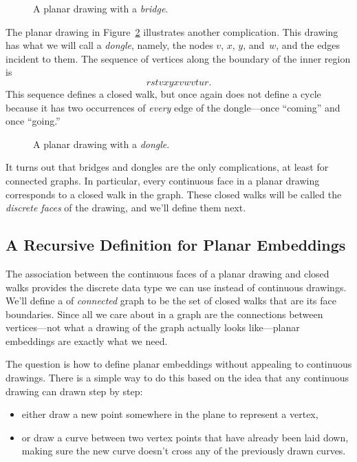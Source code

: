 \begin{figure}


\caption{A planar drawing with a \emph{bridge}.}
\label{fig:bridge}
\end{figure}

The planar drawing in Figure~\ref{fig:dongle} illustrates another
complication.  This drawing has what we will call a \emph{dongle},
namely, the nodes $v$, $x$, $y$, and~$w$, and the edges incident to
them.  The sequence of vertices along the boundary
of the inner region is
\[
rstvxyxvwvtur.
\]
This sequence defines a closed walk, but once again does not define a
cycle because it has two occurrences of \emph{every} edge of the
dongle---once ``coming'' and once ``going.''

\begin{figure}


\caption{A planar drawing with a \emph{dongle}.}
\label{fig:dongle}
\end{figure}

It turns out that bridges and dongles are the only complications, at
least for connected graphs.  In particular, every continuous face in a
planar drawing corresponds to a closed walk in the graph.  These
closed walks will be called the \emph{discrete faces} of the drawing,
and we'll define them next.

\subsection{A Recursive Definition for Planar Embeddings}

The association between the continuous faces of a planar drawing and
closed walks provides the discrete data type we can use instead of
continuous drawings.  We'll define a  of
\emph{connected} graph to be the set of closed walks that are its face
boundaries.  Since all we care about in a graph are the connections
between vertices---not what a drawing of the graph actually looks
like---planar embeddings are exactly what we need.

The question is how to define planar embeddings without appealing to
continuous drawings.  There is a simple way to do this based on the
idea that any continuous drawing can drawn step by step: 
\begin{itemize}
\item either draw a new point somewhere in the plane to represent a vertex,

\item or draw a curve between two vertex points that have already been
  laid down, making sure the new curve doesn't cross any of the
  previously drawn curves.
\end{itemize}

